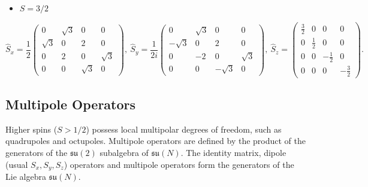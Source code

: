 \documentclass[11pt, aps, longbibliography]{article}
\begin{document}
        \begin{itemize}
            \item $S=3/2$
        \end{itemize}
        \begin{equation}\label{eq:SU4-matrix}
            \hat{S}_x = \frac{1}{2}\begin{pmatrix} 0 & \sqrt{3} & 0 & 0 \\ \sqrt{3} & 0 & 2 & 0 \\ 0 & 2 & 0 & \sqrt{3} \\ 0 & 0 & \sqrt{3} & 0 \end{pmatrix}, \ 
            \hat{S}_y = \frac{1}{2i}\begin{pmatrix} 0 & \sqrt{3} & 0 & 0 \\ -\sqrt{3} & 0 & 2 & 0 \\ 0 & -2 & 0 & \sqrt{3} \\ 0 & 0 & -\sqrt{3} & 0 \end{pmatrix}, \ 
            \hat{S}_z = \begin{pmatrix} \frac{3}{2} & 0 & 0 & 0 \\ 0 & \frac{1}{2} & 0 & 0 \\ 0 & 0 & -\frac{1}{2} & 0 \\ 0 & 0 & 0 & -\frac{3}{2} \end{pmatrix}.
        \end{equation}

    \subsection{Multipole Operators}
        Higher spins ($S>1/2$) possess local multipolar degrees of freedom, such as quadrupoles and octupoles.
        Multipole operators are defined by the product of the generators of the $\mathfrak{su}(2)$ subalgebra of $\mathfrak{su}(N)$.
        The identity matrix, dipole (usual $S_x, S_y, S_z$) operators and multipole operators form the generators of the Lie algebra $\mathfrak{su}(N)$.
\end{document}
